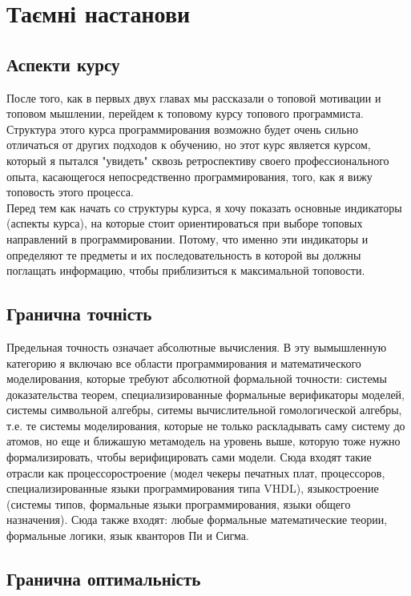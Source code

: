 \section{Таємні настанови}

\subsection{Аспекти курсу}

После того, как в первых двух главах мы рассказали о топовой мотивации и топовом мышлении, перейдем к топовому курсу топового программиста. Структура этого курса программирования возможно будет очень сильно отличаться от других подходов к обучению, но этот курс является курсом, который я пытался "увидеть" сквозь ретроспективу своего профессионального опыта, касающегося непосредственно программирования, того, как я вижу топовость этого процесса.
\\
Перед тем как начать со структуры курса, я хочу показать основные индикаторы (аспекты курса), на которые стоит ориентироваться при выборе топовых направлений в программировании. Потому, что именно эти индикаторы и определяют те предметы и их последовательность в которой вы должны поглащать информацию, чтобы приблизиться к максимальной топовости.

\subsection{Гранична точність}

Предельная точность означает абсолютные вычисления. В эту вымышленную категорию я включаю все области программирования и математического моделирования, которые требуют абсолютной формальной точности: системы доказательства теорем, специализированные формальные верификаторы моделей, системы символьной алгебры, ситемы вычислительной гомологической алгебры, т.е. те системы моделирования, которые не только раскладывать саму систему до атомов, но еще и ближашую метамодель на уровень выше, которую тоже нужно формализировать, чтобы верифицировать сами модели. Сюда входят такие отрасли как процессоростроение (модел чекеры печатных плат, процессоров, специализированные языки программирования типа VHDL), языкостроение (системы типов, формальные языки программирования, языки общего назначения). Сюда также входят: любые формальные математические теории, формальные логики, язык кванторов Пи и Сигма.

\subsection{Гранична оптимальність}

